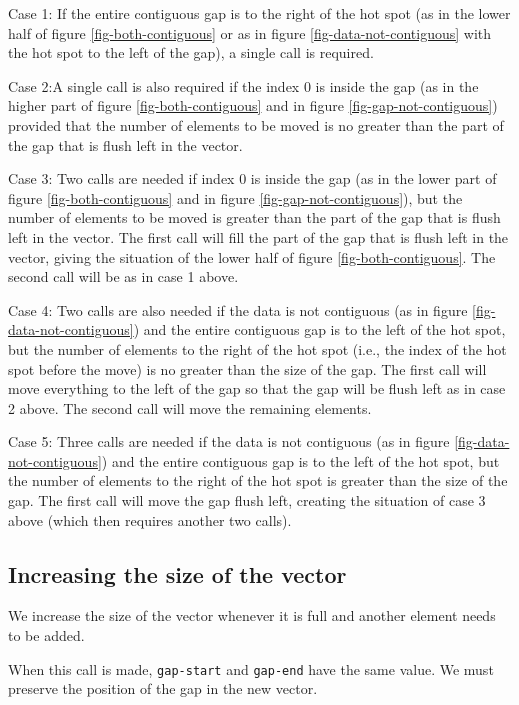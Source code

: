 \documentclass[11pt]{article}
\begin{document}
Case 1: If the entire contiguous gap is to the right of the hot spot
(as in the lower half of figure \ref{fig-both-contiguous} or as in
figure \ref{fig-data-not-contiguous} with the hot spot to the left of
the gap), a single call is required.

Case 2:A single call is also required if the index 0 is
inside the gap (as in the higher part of figure
\ref{fig-both-contiguous} and in figure \ref{fig-gap-not-contiguous})
provided that the number of elements to be moved is no greater than
the part of the gap that is flush left in the vector.

Case 3: Two calls are needed if index 0 is inside the gap (as in the
lower part of figure \ref{fig-both-contiguous} and in figure
\ref{fig-gap-not-contiguous}), but the number of elements to be moved
is greater than the part of the gap that is flush left in the vector.
The first call will fill the part of the gap that is flush left in
the vector, giving the situation of the lower half of figure
\ref{fig-both-contiguous}.  The second call will be as in case 1
above.

Case 4: Two calls are also needed if the data is not contiguous (as in
figure \ref{fig-data-not-contiguous}) and the entire contiguous gap is
to the left of the hot spot, but the number of elements to the right
of the hot spot (i.e., the index of the hot spot before the move) is
no greater than the size of the gap.  The first call will move
everything to the left of the gap so that the gap will be flush left
as in case 2 above.  The second call will move the remaining
elements.

Case 5: Three calls are needed if the data is not contiguous (as in
figure \ref{fig-data-not-contiguous}) and the entire contiguous gap is
to the left of the hot spot, but the number of elements to the right
of the hot spot is greater than the size of the gap.  The first call
will move the gap flush left, creating the situation of case 3 above
(which then requires another two calls).

\subsection{Increasing the size of the vector}

We increase the size of the vector whenever it is full and another
element needs to be added.

When this call is made, \texttt{gap-start} and \texttt{gap-end} have
the same value.  We must preserve the position of the gap in the new
vector.
\end{document}

